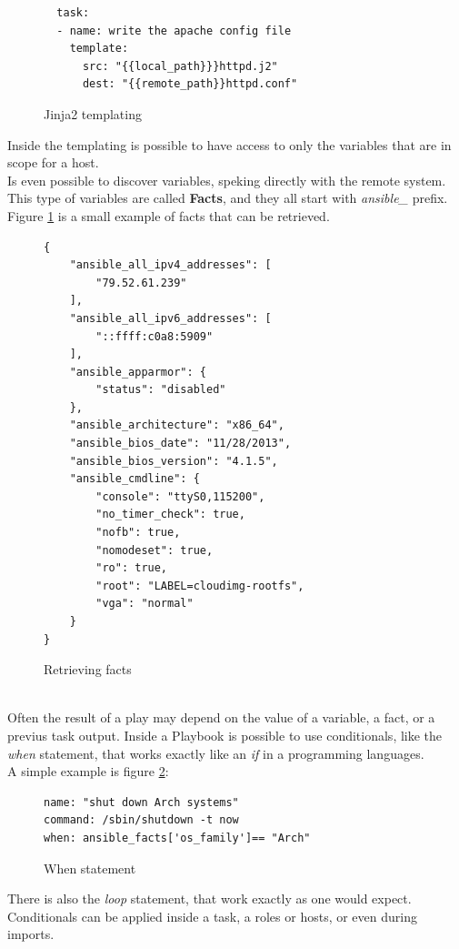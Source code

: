 \documentclass[conference]{IEEEtran}
\begin{document}
\begin{figure}[h]
\begin{verbatim}
  task:
  - name: write the apache config file
    template:
      src: "{{local_path}}}httpd.j2"
      dest: "{{remote_path}}httpd.conf"
  \end{verbatim}
  \caption{Jinja2 templating}
\end{figure}
Inside the templating is possible to have access to only the variables that are in scope for a host.\\
Is even possible to discover variables, speking directly with the remote system. This type of variables are called \textbf{Facts}, and they all start with \textit{ansible\_} prefix. Figure \ref{facts} is a small example of facts that can be retrieved.\\
\begin{figure}[h]
\begin{verbatim}
{
    "ansible_all_ipv4_addresses": [
        "79.52.61.239"
    ],
    "ansible_all_ipv6_addresses": [
        "::ffff:c0a8:5909"
    ],
    "ansible_apparmor": {
        "status": "disabled"
    },
    "ansible_architecture": "x86_64",
    "ansible_bios_date": "11/28/2013",
    "ansible_bios_version": "4.1.5",
    "ansible_cmdline": {
        "console": "ttyS0,115200",
        "no_timer_check": true,
        "nofb": true,
        "nomodeset": true,
        "ro": true,
        "root": "LABEL=cloudimg-rootfs",
        "vga": "normal"
    }
}
  \end{verbatim}
  \caption{Retrieving facts}
  \label{facts}
\end{figure}\\
Often the result of a play may depend on the value of a variable, a fact, or a previus task output. Inside a Playbook is possible to use conditionals, like the \textit{when} statement, that works exactly like an \textit{if} in a programming languages.\\ 
A simple example is figure \ref{when}:\\
\begin{figure}[h!]
\begin{verbatim}
name: "shut down Arch systems"
command: /sbin/shutdown -t now
when: ansible_facts['os_family']== "Arch"
  \end{verbatim}
  \caption{When statement}
  \label{when}
  \end{figure}
There is also the \textit{loop} statement, that work exactly as one would expect.\\
Conditionals can be applied inside a task, a roles or hosts, or even during imports.
\end{document}
